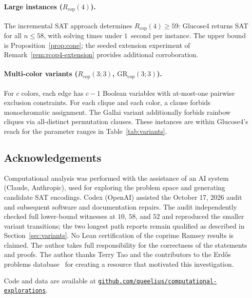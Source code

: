 \documentclass[12pt]{article}
\newcommand{\Rcop}{R_{\mathrm{cop}}}
\newcommand{\GRcop}{\mathrm{GR}_{\mathrm{cop}}}
\begin{document}
\paragraph{Large instances ($\Rcop(4)$).}
The incremental SAT approach determines $\Rcop(4)\ge 59$: Glucose4
returns SAT for all $n\le 58$, with solving times under $1$~second per
instance. The upper bound is Proposition~\ref{prop:cone}; the seeded
extension experiment of Remark~\ref{rem:rcop4-extension} provides
additional corroboration.

\paragraph{Multi-color variants ($\Rcop(3;3)$, $\GRcop(3;3)$).}
For $c$ colors, each edge has $c-1$ Boolean variables with
at-most-one pairwise exclusion constraints. For each clique and each
color, a clause forbids monochromatic assignment. The Gallai variant
additionally forbids rainbow cliques via all-distinct permutation
clauses. These instances are within Glucose4's reach for the parameter
ranges in Table~\ref{tab:variants}.

\subsection*{Acknowledgements}

Computational analysis was performed with the assistance of an AI
system (Claude, Anthropic), used for exploring the problem space and
generating candidate SAT encodings. Codex (OpenAI) assisted the
October 17, 2026 audit and subsequent software and documentation repairs.
The audit
independently checked full lower-bound witnesses at $10$, $58$, and $52$
and reproduced the smaller variant transitions; the two longest path
reports remain qualified as described in Section~\ref{sec:variants}.
No Lean certification of the coprime Ramsey results is claimed.
The author takes full responsibility for the correctness of the
statements and proofs. The author thanks Terry Tao and the contributors
to the Erd\H{o}s problems database~\cite{tao2025erdos} for creating a
resource that motivated this investigation.

\smallskip\noindent
Code and data are available at
\href{https://github.com/queelius/computational-explorations}%
{\nolinkurl{github.com/queelius/computational-explorations}}.
\end{document}
